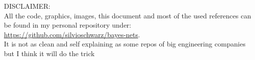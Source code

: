 DISCLAIMER:\\
All the code, graphics, images, this document and most of the used references can be found in my personal repository under:\\
\href{https://github.com/silvioschwarz/bayes-nets}{https://github.com/silvioschwarz/bayes-nets}.\\ It is not as clean and self explaining as some repos of big engineering companies but I think it will do the trick
